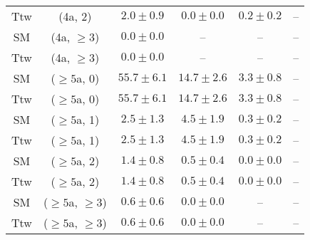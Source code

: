 \begin{table}[h!]
{\begin{tabular}{cccccc}
	Ttw & (4a, 2) & $2.0\pm 0.9$ & $0.0\pm 0.0$ & $0.2\pm 0.2$ & -- \\[0.5ex] 
	SM & (4a, $\ge3$) & $0.0\pm 0.0$ & -- & -- & -- \\[0.5ex] 
	Ttw & (4a, $\ge3$) & $0.0\pm 0.0$ & -- & -- & -- \\[0.5ex] 
	SM & ($\ge5$a, 0) & $55.7\pm 6.1$ & $14.7\pm 2.6$ & $3.3\pm 0.8$ & -- \\[0.5ex] 
	Ttw & ($\ge5$a, 0) & $55.7\pm 6.1$ & $14.7\pm 2.6$ & $3.3\pm 0.8$ & -- \\[0.5ex] 
	SM & ($\ge5$a, 1) & $2.5\pm 1.3$ & $4.5\pm 1.9$ & $0.3\pm 0.2$ & -- \\[0.5ex] 
	Ttw & ($\ge5$a, 1) & $2.5\pm 1.3$ & $4.5\pm 1.9$ & $0.3\pm 0.2$ & -- \\[0.5ex] 
	SM & ($\ge5$a, 2) & $1.4\pm 0.8$ & $0.5\pm 0.4$ & $0.0\pm 0.0$ & -- \\[0.5ex] 
	Ttw & ($\ge5$a, 2) & $1.4\pm 0.8$ & $0.5\pm 0.4$ & $0.0\pm 0.0$ & -- \\[0.5ex] 
	SM & ($\ge5$a, $\ge3$) & $0.6\pm 0.6$ & $0.0\pm 0.0$ & -- & -- \\[0.5ex] 
	Ttw & ($\ge5$a, $\ge3$) & $0.6\pm 0.6$ & $0.0\pm 0.0$ & -- & -- \\[0.5ex] 
	\hline
	\hline
\end{tabular}}
\end{table}
